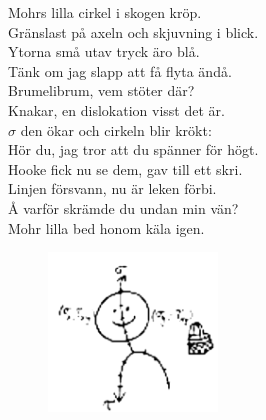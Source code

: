 \documentclass[a6paper, 10pt, twoside]{article}
\begin{document}
\noindent
\begin{center}
\end{center}
\begin{lyrics}
Mohrs lilla cirkel i skogen kröp. \\
Gränslast på axeln och skjuvning i blick. \\
Ytorna små utav tryck äro blå. \\
Tänk om jag slapp att få flyta ändå. 
\vspace{5pt} \\
Brumelibrum, vem stöter där? \\
Knakar, en dislokation visst det är. \\
$\sigma$ den ökar och cirkeln blir krökt: \\
Hör du, jag tror att du spänner för högt. 
\vspace{5pt} \\
Hooke fick nu se dem, gav till ett skri. \\
Linjen försvann, nu är leken förbi. \\
Å varför skrämde du undan min vän? \\
Mohr lilla bed honom käla igen. 
\end{lyrics}

\begin{figure}[!h]
\centering
\includegraphics[width=0.4\textwidth]{Hallfgubbe.png}
\end{figure}
\end{document}
